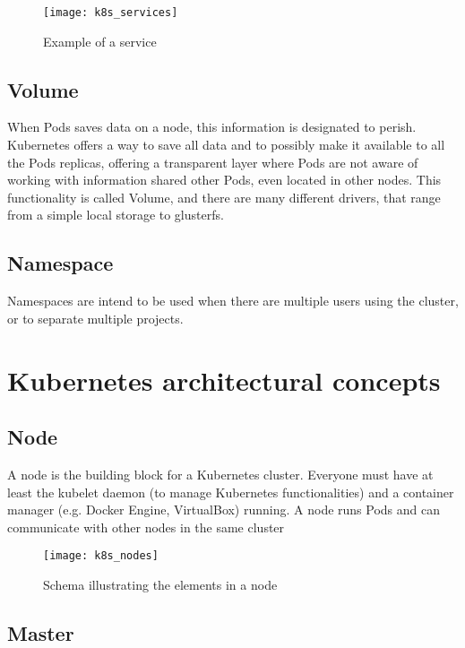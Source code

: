 \begin{figure}[htbp]
\centering
\texttt{[image: k8s\_services]}
\caption{Example of a service}
\end{figure}

\subsection{Volume}
\label{volume}

When Pods saves data on a node, this information is designated to perish.
Kubernetes offers a way to save all data and to possibly make it
available to all the Pods replicas, offering a transparent layer where
Pods are not aware of working with information shared other Pods, even located
in other nodes. This functionality is called Volume, and there are many
different drivers, that range from a simple local storage to glusterfs.

\subsection{Namespace}
\label{namespace}

Namespaces are intend to be used when there are multiple users using the
cluster, or to separate multiple projects.

\section{Kubernetes architectural concepts}
\label{kubernetes-architectural-concepts}

\subsection{Node}\label{node}

A node is the building block for a Kubernetes cluster. Everyone must have
at least the kubelet daemon (to manage Kubernetes functionalities) and a
container manager (e.g. Docker Engine, VirtualBox) running. A node runs Pods
and can communicate with other nodes in the same cluster

\begin{figure}[htbp]
\centering
\texttt{[image: k8s\_nodes]}
\caption{Schema illustrating the elements in a node}
\end{figure}

\subsection{Master}
\label{master}

